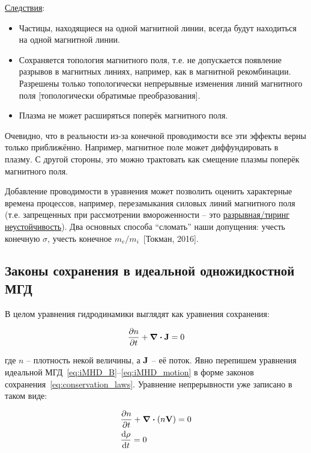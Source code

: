 \documentclass[10pt, a4paper]{article}
\newcommand{\Tokman}{~[Токман, 2016]}
\begin{document}
\uline{Следствия}:

\begin{itemize}
	\item Частицы, находящиеся на одной магнитной линии, всегда будут находиться на одной магнитной линии.
	\item Сохраняется топология магнитного поля, т.е. не допускается появление разрывов в магнитных линиях, например, как в магнитной рекомбинации. Разрешены только топологически непрерывные изменения линий магнитного поля [топологически обратимые преобразования].
	\item Плазма не может расширяться поперёк магнитного поля.
\end{itemize}

Очевидно, что в реальности из-за конечной проводимости все эти эффекты верны только приближённо. Например, магнитное поле может диффундировать в плазму. С другой стороны, это можно трактовать как смещение плазмы поперёк магнитного поля.

Добавление проводимости в уравнения может позволить оценить характерные времена процессов, например, перезамыкания силовых линий магнитного поля (т.е. запрещенных при рассмотрении вмороженности -- это \uline{разрывная/тиринг неустойчивость}). Два основных способа ``сломать'' наши допущения: учесть конечную $\sigma$, учесть конечное $m_e/m_i$\Tokman.

\subsection{Законы сохранения в идеальной одножидкостной МГД}

В целом уравнения гидродинамики выглядят как уравнения сохранения:

\begin{equation}
	\label{eq:conservation_laws}
	\pdv{n}{t} + \div{\vb{J}} = 0
\end{equation}

где $n$ -- плотность некой величины, а $\vb{J}$ -- её поток.
Явно перепишем уравнения идеальной МГД~\eqref{eq:iMHD_B}--\eqref{eq:iMHD_motion} в форме законов сохранения~\eqref{eq:conservation_laws}. Уравнение непрерывности уже записано в таком виде:

\begin{align}
	\label{eq:conservation_laws_1}
	&\pdv{n}{t} + \divergence{\left( n\vb{V} \right)} = 0 \\
	&\dv{\rho}{t} = 0
\end{align}
\end{document}
